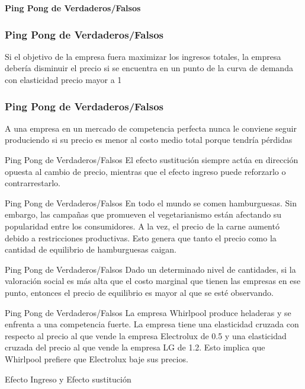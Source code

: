 \documentclass{beamer}
\begin{document}
\begin{frame}
    \centering
    \begin{boxB}
    \centering \Large \textbf{Ping Pong de Verdaderos/Falsos} \\   
    \end{boxB}
\end{frame}

\begin{frame}
\frametitle{Ping Pong de Verdaderos/Falsos}
\centering
Si el objetivo de la empresa fuera maximizar los ingresos totales, la empresa debería disminuir el precio si se encuentra en un punto de la curva de demanda con elasticidad precio mayor a 1
\end{frame}

\begin{frame}
\frametitle{Ping Pong de Verdaderos/Falsos}
\centering
A una empresa en un mercado de competencia perfecta nunca le conviene seguir produciendo si su precio es menor al costo medio total porque tendría pérdidas
\end{frame}

\begin{frame}{Ping Pong de Verdaderos/Falsos}
    \centering
    El efecto sustitución siempre actúa en dirección opuesta al cambio de precio, mientras que el efecto ingreso puede reforzarlo o contrarrestarlo.
\end{frame}

\begin{frame}{Ping Pong de Verdaderos/Falsos}
    \centering
    En todo el mundo se comen hamburguesas. Sin embargo, las campañas que promueven el vegetarianismo están afectando su popularidad entre los consumidores. A la vez, el precio de la carne aumentó debido a restricciones productivas. Esto genera que tanto el precio como la cantidad de equilibrio de hamburguesas caigan. 
\end{frame}

\begin{frame}{Ping Pong de Verdaderos/Falsos}
    \centering
    Dado un determinado nivel de cantidades, si la valoración social es más alta que el costo marginal que tienen las empresas en ese punto, entonces el precio de equilibrio es mayor al que se esté observando.
\end{frame}

\begin{frame}{Ping Pong de Verdaderos/Falsos}
    \centering
    La empresa Whirlpool produce heladeras y se enfrenta a una competencia fuerte. La empresa tiene una elasticidad cruzada con respecto al precio al que vende la empresa Electrolux de 0.5 y una elasticidad cruzada del precio al que vende la empresa LG de 1.2. Esto implica que Whirlpool prefiere que Electrolux baje sus precios.
\end{frame}

\begin{frame}{Efecto Ingreso y Efecto sustitución}
    \centering
    
\end{frame}
\end{document}

